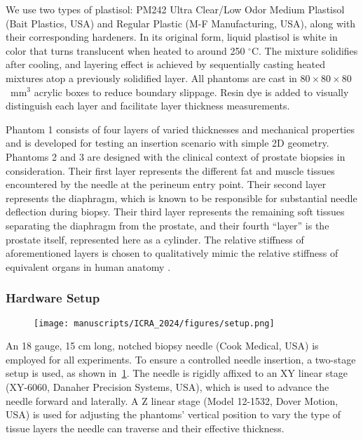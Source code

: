 We use two types of plastisol: PM242 Ultra Clear/Low Odor Medium Plastisol (Bait Plastics, USA) and Regular Plastic (M-F Manufacturing, USA), along with their corresponding hardeners. In its original form, liquid plastisol is white in color that turns translucent when heated to around 250 $^{\circ}$C. The mixture solidifies after cooling, and layering effect is achieved by sequentially casting heated mixtures atop a previously solidified layer. All phantoms are cast in $80\times80\times80$~mm$^3$ acrylic boxes to reduce boundary slippage. Resin dye is added to visually distinguish each layer and facilitate layer thickness measurements.

Phantom 1 consists of four layers of varied thicknesses and mechanical properties and is developed for testing an insertion scenario with simple 2D geometry. Phantoms 2 and 3 are designed with the clinical context of prostate biopsies in consideration. Their first layer represents the different fat and muscle tissues encountered by the needle at the perineum entry point. Their second layer represents the diaphragm, which is known to be responsible for substantial needle deflection during biopsy. Their third layer represents the remaining soft tissues separating the diaphragm from the prostate, and their fourth ``layer'' is the prostate itself, represented here as a cylinder. The relative stiffness of aforementioned layers is chosen to qualitatively mimic the relative stiffness of equivalent organs in human anatomy \parencite{boubakerFiniteElementSimulation2009}.

\subsubsection{Hardware Setup}
\label{sec:chap-4-hardware-setup}

\begin{figure}[ht]
  \centering
  \texttt{[image: manuscripts/ICRA\_2024/figures/setup.png]}
  \caption{}
  \label{fig:chap-4-robot}
\end{figure}

An 18 gauge, 15 cm long, notched biopsy needle (Cook Medical, USA) is employed for all experiments. To ensure a controlled needle insertion, a two-stage setup is used, as shown in~\cref{fig:chap-4-robot}. The needle is rigidly affixed to an XY linear stage (XY-6060, Danaher Precision Systems, USA), which is used to advance the needle forward and laterally. A Z linear stage (Model 12-1532, Dover Motion, USA) is used for adjusting the phantoms' vertical position to vary the type of tissue layers the needle can traverse and their effective thickness. 

